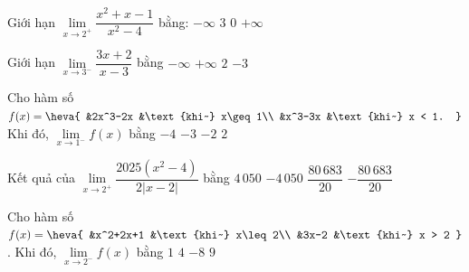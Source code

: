 \begin{ex}%
	 Giới hạn $\lim\limits_{x\to{2^{+}}}\dfrac{x^2+x-1}{x^2-4}$ bằng:
	 \choice
		{$-\infty$} 
		{$3$} 
		 {$0$}
		 {\True $+\infty$}
\end{ex}

\begin{ex}%
	Giới hạn $\lim\limits_{x\to{3^{-}}}\dfrac{3x+2}{x-3}$  bằng
	\choice 
		 {\True $-\infty$}
		{$+\infty$} 
		 {$2$}
		{$-3$} 
\end{ex}

\begin{ex}%
	Cho hàm số  $f(x)=\heva{
	 &2x^3-2x &\text{khi~} x\geq 1\\
	&x^3-3x &\text{khi~}  x < 1.
	}$ Khi  đó, $\lim\limits_{x\to 1^-} f(x)$ bằng
	\choice 
		 {$-4$}
		 {$-3$}
		{\True$-2$} 
		{$2$} 
\end{ex}

\begin{ex}%
	Kết quả  của $\lim\limits_{x \to 2^{+}} \dfrac{2025\left(x^2-4\right)}{2|x-2|}$ bằng
	 \choice
		{\True $4\,050$} 
		{$-4\,050$} 
		 {$\dfrac{80\,683}{20}$}
		 {$-\dfrac{80\,683}{20}$}
\end{ex}

\begin{ex}%
	Cho hàm số $f(x)= 
	 \heva{
	&x^2+2x+1 &\text{khi~} x\leq 2\\ 
	&3x-2 &\text{khi~} x >  2
	}$.  Khi đó, $\lim\limits_{x\to 2^-} f(x)$ bằng
	 \choice
		{$1$} 
		{$4$} 
		{$-8$} 
		{\True $9$} 
\end{ex}


